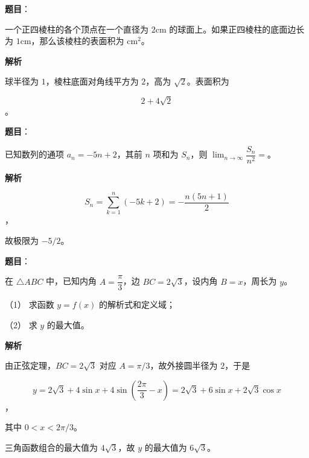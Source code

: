 \begin{answer}

\textbf{题目}：

一个正四棱柱的各个顶点在一个直径为 $2\mathrm{cm}$ 的球面上。如果正四棱柱的底面边长为 $1\mathrm{cm}$，那么该棱柱的表面积为\gkblank{} $\mathrm{cm}^2$。

\textbf{解析}

球半径为 $1$，棱柱底面对角线平方为 $2$，高为 $\sqrt2$。表面积为

\nopagebreak[4]
\[
2+4\sqrt2
\]
。


\end{answer}
\begin{answer}

\textbf{题目}：

已知数列的通项 $a_n=-5n+2$，其前 $n$ 项和为 $S_n$，则 $\displaystyle\lim_{n\to\infty}\dfrac{S_n}{n^2}=$\gkblank{}。

\textbf{解析}

\nopagebreak[4]
\[
S_n=\sum_{k=1}^n(-5k+2)=-\frac{n(5n+1)}2
\]
，

故极限为 $-5/2$。


\end{answer}
\begin{answer}

\textbf{题目}：

在 $\triangle ABC$ 中，已知内角 $A=\dfrac\pi3$，边 $BC=2\sqrt3$，设内角 $B=x$，周长为 $y$。

（1） 求函数 $y=f(x)$ 的解析式和定义域；

（2） 求 $y$ 的最大值。

\textbf{解析}


由正弦定理，$BC=2\sqrt3$ 对应 $A=\pi/3$，故外接圆半径为 $2$，于是

\nopagebreak[4]
\[
y=2\sqrt3+4\sin x+4\sin\left(\frac{2\pi}3-x\right)
=2\sqrt3+6\sin x+2\sqrt3\cos x
\]
，

其中 $0<x<2\pi/3$。


三角函数组合的最大值为 $4\sqrt3$，故 $y$ 的最大值为 $6\sqrt3$。



\end{answer}
